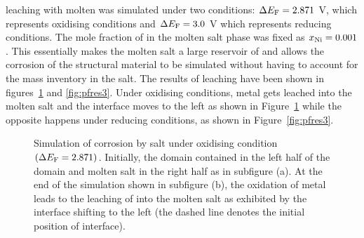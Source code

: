  leaching with molten  was simulated under two conditions: $\Delta E_{\ce{F}} = 2.871$ \si{\volt}, which represents oxidising conditions and $\Delta E_{\ce{F}} = 3.0$ \si{\volt} which represents reducing conditions. The mole fraction of  in the molten salt phase was fixed as $x_{\ce{Ni}} = 0.001$. This essentially makes the molten salt a large reservoir of  and allows the corrosion of the structural material to be simulated without having to account for the mass inventory in the salt. The results of  leaching have been shown in figures~\ref{fig:pfres2} and \ref{fig:pfres3}. Under oxidising conditions,  metal gets leached into the molten salt and the interface moves to the left as shown in Figure~\ref{fig:pfres2} while the opposite happens under reducing conditions, as shown in  Figure~\ref{fig:pfres3}. 
\begin{figure}[!ht]
    \hfill
    \caption[ corrosion by  salt under oxidising condition $\left(\Delta E_{\ce{F}} = 2.871\right)$.]{Simulation of  corrosion by  salt under oxidising condition $\left(\Delta E_{\ce{F}} = 2.871\right)$. Initially, the domain contained  in the left half of the domain and molten salt in the right half as in subfigure (a). At the end of the simulation shown in subfigure (b), the oxidation of  metal leads to the leaching of  into the molten salt as exhibited by the interface shifting to the left (the dashed line denotes the initial position of interface).}
    \label{fig:pfres2}
\end{figure}

